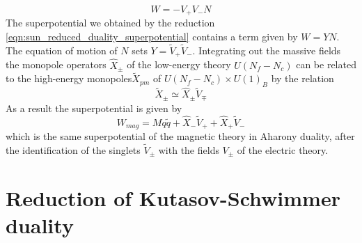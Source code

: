 \begin{equation}
W = - V_+ V_- N
\end{equation}
The superpotential we obtained by the reduction \eqref{eqn:sun_reduced_duality_superpotential} contains a term given by $W = Y N $. The equation of motion of $N$ sets $Y= \tilde{V}_+ \tilde{V}_-$.
Integrating out the massive fields the monopole operators $\hat{X}_{\pm}$ of the low-energy theory $U(N_f - N_c)$ can be related to the high-energy monopoles$\tilde{X}_{pm}$ of $U(N_f - N_c) \times U(1)_B$ by the relation \cite{Aharony:2013dha}
\begin{equation}
\tilde{X}_{\pm} \simeq \hat{X}_{\pm} \tilde{V}_{\mp}
\end{equation}
As a result the superpotential is given by
\begin{equation}
W_{mag} = M q \tilde{q} + \hat{X}_- \tilde{V}_+ + \hat{X}_+ \tilde{V}_-
\end{equation}
which is the same superpotential of the magnetic theory in Aharony duality, after the identification of the singlets $\tilde{V}_{\pm}$ with the fields $V_{\pm}$ of the electric theory.



\section{Reduction of Kutasov-Schwimmer duality}

